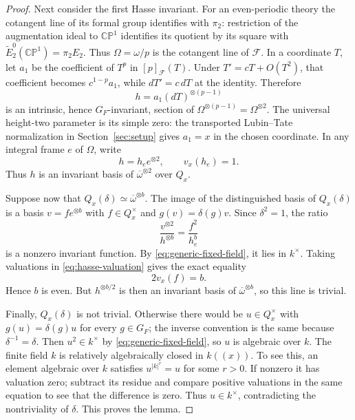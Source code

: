 \begin{proof}
Next consider the first Hasse invariant. For an even-periodic theory the
cotangent line of its formal group identifies with \(\pi_2\): restriction
of the augmentation ideal to \(\mathbb{CP}^1\) identifies its quotient by
its square with \(\widetilde E_2^0(\mathbb{CP}^1)=\pi_2E_2\). Thus
\(\Omega=\omega/p\) is the cotangent line of \(\mathcal F\). In a coordinate
\(T\), let \(a_1\) be the coefficient of \(T^p\) in \([p]_{\mathcal F}(T)\).
Under \(T'=cT+O(T^2)\), that coefficient becomes \(c^{1-p}a_1\), while
\(dT'=c\,dT\) at the identity. Therefore
\[
                    h=a_1(dT)^{\otimes(p-1)}
\]
is an intrinsic, hence \(G_F\)-invariant, section of
\(\Omega^{\otimes(p-1)}=\Omega^{\otimes2}\). The universal height-two
parameter is its simple zero: the transported Lubin--Tate normalization
in Section~\ref{sec:setup} gives \(a_1=x\) in the chosen coordinate.
In any integral frame \(e\) of \(\Omega\), write
\begin{equation}\label{eq:hasse-valuation}
                    h=h_e e^{\otimes2},\qquad v_x(h_e)=1.
\end{equation}
Thus \(h\) is an invariant basis of \(\overline\omega^{\otimes2}\) over
\(Q_x\).

Suppose now that \(Q_x(\delta)\simeq\overline\omega^{\otimes b}\). The image
of the distinguished basis of \(Q_x(\delta)\) is a basis
\(v=f e^{\otimes b}\) with \(f\in Q_x^\times\) and
\(g(v)=\delta(g)v\). Since \(\delta^2=1\), the ratio
\[
               \frac{v^{\otimes2}}{h^{\otimes b}}
                     =\frac{f^2}{h_e^b}
\]
is a nonzero invariant function. By \eqref{eq:generic-fixed-field}, it lies
in \(k^\times\). Taking valuations in \eqref{eq:hasse-valuation} gives the
exact equality
\begin{equation}\label{eq:character-parity}
                              2v_x(f)=b.
\end{equation}
Hence \(b\) is even. But \(h^{\otimes b/2}\) is then an invariant basis of
\(\overline\omega^{\otimes b}\), so this line is trivial.

Finally, \(Q_x(\delta)\) is not trivial. Otherwise there would be
\(u\in Q_x^\times\) with \(g(u)=\delta(g)u\) for every \(g\in G_F\); the
inverse convention is the same because \(\delta^{-1}=\delta\). Then
\(u^2\in k^\times\) by \eqref{eq:generic-fixed-field}, so \(u\) is algebraic
over \(k\). The finite field \(k\) is relatively algebraically closed in
\(k((x))\). To see this, an element algebraic over \(k\) satisfies
\(u^{|k|^r}=u\) for some \(r>0\). If nonzero it has valuation zero;
subtract its residue and compare positive valuations in the same equation
to see that the difference is zero. Thus \(u\in k^\times\), contradicting
the nontriviality of \(\delta\). This proves the lemma.
\end{proof}

